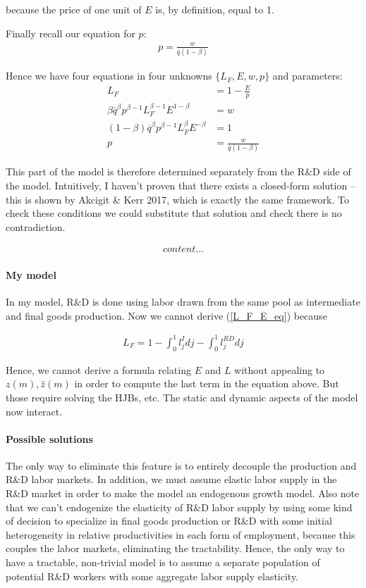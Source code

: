 \documentclass[12pt,english]{article}
\theoremstyle{remark}
\begin{document}
because the price of one unit of $E$ is, by definition, equal to 1. 

Finally recall our equation for $p$: 
\begin{align*}
p = \frac{w}{\overline{q}(1-\beta)}
\end{align*}

Hence we have four equations in four unknowns $\{ L_F,E,w,p \}$ and parameters:
\begin{align}
L_F	&= 1- \frac{E}{p} \label{L_F_E_eq}\\
\beta \overline{q}^{\beta} p^{\beta - 1} L_F^{\beta -1} E^{1-\beta} &= w \\ 
(1-\beta) \overline{q}^{\beta} p^{\beta - 1} L_F^{\beta} E^{-\beta} &= 1 \\
p &= \frac{w}{\overline{q}(1-\beta)}
\end{align}

This part of the model is therefore determined separately from the R\&D side of the model. Intuitively, I haven't proven that there exists a closed-form solution -- this is shown by Akcigit \& Kerr 2017, which is exactly the same framework. To check these conditions we could substitute that solution and check there is no contradiction.

\begin{align*}
content...
\end{align*}


\paragraph{My model} In my model, R\&D is done using labor drawn from the same pool as intermediate and final goods production. Now we cannot derive (\ref{L_F_E_eq}) because 

\begin{align*}
L_F = 1 - \int_0^1 l_j^I dj - \int_0^1 l_j^{RD} dj
\end{align*}

Hence, we cannot derive a formula relating $E$ and $L$ without appealing to $z(m),\hat{z}(m)$ in order to compute the last term in the equation above. But those require solving the HJBs, etc. The static and dynamic aspects of the model now interact. 

\paragraph{Possible solutions} The only way to eliminate this feature is to entirely decouple the production and R\&D labor markets. In addition, we must assume elastic labor supply in the R\&D market in order to make the model an endogenous growth model. Also note that we can't endogenize the elasticity of R\&D labor supply by using some kind of decision to specialize in final goods production or R\&D with some initial heterogeneity in relative productivities in each form of employment, because this couples the labor markets, eliminating the tractability. Hence, the only way to have a tractable, non-trivial model is to assume a separate population of potential R\&D workers with some aggregate labor supply elasticity.
\end{document}
